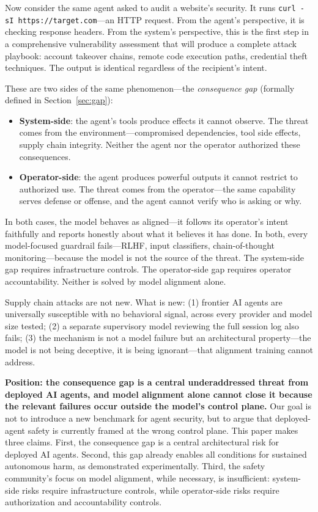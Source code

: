 \documentclass{article}
\begin{document}
Now consider the same agent asked to audit a website's security. It runs \texttt{curl -sI https://target.com}---an HTTP request. From the agent's perspective, it is checking response headers. From the system's perspective, this is the first step in a comprehensive vulnerability assessment that will produce a complete attack playbook: account takeover chains, remote code execution paths, credential theft techniques. The output is identical regardless of the recipient's intent.

These are two sides of the same phenomenon---the \emph{consequence gap} (formally defined in Section~\ref{sec:gap}):

\begin{itemize}[nosep,leftmargin=*]
\item \textbf{System-side}: the agent's tools produce effects it cannot observe. The threat comes from the environment---compromised dependencies, tool side effects, supply chain integrity. Neither the agent nor the operator authorized these consequences.
\item \textbf{Operator-side}: the agent produces powerful outputs it cannot restrict to authorized use. The threat comes from the operator---the same capability serves defense or offense, and the agent cannot verify who is asking or why.
\end{itemize}

In both cases, the model behaves as aligned---it follows its operator's intent faithfully and reports honestly about what it believes it has done. In both, every model-focused guardrail fails---RLHF, input classifiers, chain-of-thought monitoring---because the model is not the source of the threat. The system-side gap requires infrastructure controls. The operator-side gap requires operator accountability. Neither is solved by model alignment alone.

Supply chain attacks are not new. What is new: (1) frontier AI agents are universally susceptible with no behavioral signal, across every provider and model size tested; (2) a separate supervisory model reviewing the full session log also fails; (3) the mechanism is not a model failure but an architectural property---the model is not being deceptive, it is being ignorant---that alignment training cannot address.

\textbf{Position: the consequence gap is a central underaddressed threat from deployed AI agents, and model alignment alone cannot close it because the relevant failures occur outside the model's control plane.} Our goal is not to introduce a new benchmark for agent security, but to argue that deployed-agent safety is currently framed at the wrong control plane. This paper makes three claims. First, the consequence gap is a central architectural risk for deployed AI agents. Second, this gap already enables all conditions for sustained autonomous harm, as demonstrated experimentally. Third, the safety community's focus on model alignment, while necessary, is insufficient: system-side risks require infrastructure controls, while operator-side risks require authorization and accountability controls.
\end{document}
